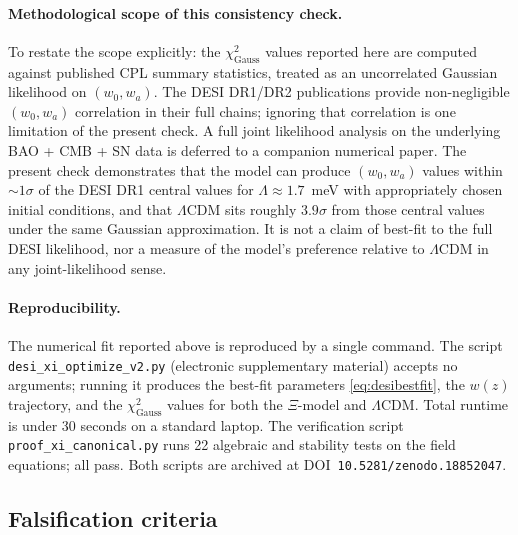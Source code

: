 \documentclass[11pt,reqno]{amsart}
\theoremstyle{plain}
\theoremstyle{definition}
\theoremstyle{remark}
\begin{document}
\paragraph{Methodological scope of this consistency check.}
To restate the scope explicitly: the $\chi^{2}_{\text{Gauss}}$ values
reported here are computed against published CPL summary statistics,
treated as an uncorrelated Gaussian likelihood on $(w_0, w_a)$. The
DESI DR1/DR2 publications provide non-negligible $(w_0, w_a)$
correlation in their full chains; ignoring that correlation is one
limitation of the present check. A full joint likelihood analysis
on the underlying BAO + CMB + SN data is deferred to a companion
numerical paper. The present check demonstrates that the model can
produce $(w_0, w_a)$ values within $\sim 1\sigma$ of the DESI DR1
central values for $\Lambda \approx 1.7$~meV with appropriately
chosen initial conditions, and that $\Lambda$CDM sits roughly
$3.9\sigma$ from those central values under the same Gaussian
approximation. It is not a claim of best-fit to the full DESI
likelihood, nor a measure of the model's preference relative to
$\Lambda$CDM in any joint-likelihood sense.

\paragraph{Reproducibility.}
The numerical fit reported above is reproduced by a single command. The
script \texttt{desi\_xi\_optimize\_v2.py} (electronic supplementary material)
accepts no arguments; running it produces the best-fit parameters
\eqref{eq:desibestfit}, the $w(z)$ trajectory, and the
$\chi^{2}_{\text{Gauss}}$ values for both the $\Xi$-model and
$\Lambda$CDM. Total runtime is under 30 seconds on a standard laptop.
The verification script \texttt{proof\_xi\_canonical.py} runs 22
algebraic and stability tests on the field equations; all pass. Both
scripts are archived at DOI~\texttt{10.5281/zenodo.18852047}.

\subsection{Falsification criteria}\label{sec:falsify}
\end{document}
